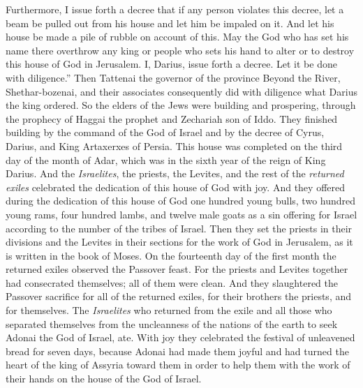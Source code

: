 \begin{biblechapter}
\verse Furthermore, I issue forth a decree that if any person violates this decree, let a beam be pulled out from his house and let him be impaled on it. And let his house be made a pile of rubble on account of this.
\verse May the God who has set his name there overthrow any king or people who sets his hand to alter or to destroy this house of God in Jerusalem. I, Darius, issue forth a decree. Let it be done with diligence.”
 Then Tattenai the governor of the province Beyond the River, Shethar-bozenai, and their associates consequently did with diligence what Darius the king ordered.
\verse So the elders of the Jews were building and prospering, through the prophecy of Haggai the prophet and Zechariah son of Iddo. They finished building by the command of the God of Israel and by the decree of Cyrus, Darius, and King Artaxerxes of Persia.
\verse This house was completed on the third day of the month of Adar, which was in the sixth year of the reign of King Darius.
\verse And the \textit{Israelites}, the priests, the Levites, and the rest of the \textit{returned exiles} celebrated the dedication of this house of God with joy.
\verse And they offered during the dedication of this house of God one hundred young bulls, two hundred young rams, four hundred lambs, and twelve male goats as a sin offering for Israel according to the number of the tribes of Israel.
\verse Then they set the priests in their divisions and the Levites in their sections for the work of God in Jerusalem, as it is written in the book of Moses.
 On the fourteenth day of the first month the returned exiles observed the Passover feast.
\verse For the priests and Levites together had consecrated themselves; all of them were clean. And they slaughtered the Passover sacrifice for all of the returned exiles, for their brothers the priests, and for themselves.
\verse The \textit{Israelites} who returned from the exile and all those who separated themselves from the uncleanness of the nations of the earth to seek Adonai the God of Israel, ate.
\verse With joy they celebrated the festival of unleavened bread for seven days, because Adonai had made them joyful and had turned the heart of the king of Assyria toward them in order to help them with the work of their hands on the house of the God of Israel.
\end{biblechapter}


